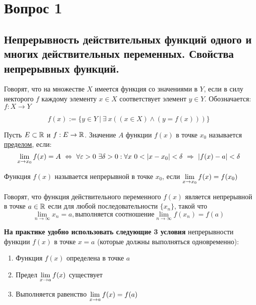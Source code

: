 \section{Вопрос 1}

\subsection{Непрерывность действительных функций одного и многих действительных переменных. Свойства непрерывных функций.}

\begin{DEF}
Говорят, что на множестве $X$ имеется функция со значениями в $Y$, если в силу некторого $f$ каждому элементу $x \in X$ соответствует элемент $y \in Y$. Обозначается: $f: X \to Y$

$$f(x) := \{ y \in Y \ | \ \exists \ x ((x\in X) \wedge (y = f(x))) \} $$
\end{DEF}


\begin{DEF}
	Пусть $E \subset \mathbb{R}$ и $f: E \to \mathbb{R}$. Значение $A$ функции $f(x)$ в точке $x_0$ называется \underline{пределом}, если:
	$$\lim_{x\to x_0} f(x) = A \ \Leftrightarrow \ \forall \varepsilon > 0 \ \exists \delta > 0: \forall x \ 0 < \left| x - x_0\right| < \delta \ \Rightarrow \ \left| f(x) - a\right| < \delta$$
\end{DEF}

\begin{DEF}
	Функция $f(x)$ называется непрерывной в точке $x_0$, если $\lim\limits_{x \to x_0}f(x) = f(x_0)$
\end{DEF}

\begin{DEF}
	Говорят, что функция действительного переменного $f(x)$ является непрерывной в точке $a \in \mathbb{R}$ если для любой последовательности $\{x_n\}$, такой что
	$$\lim_{n \to \infty}x_n = a, \text{выполняется соотношение} \lim_{n \to \infty}f(x_n) = f(a)$$
\end{DEF}

\textbf{На практике удобно использовать следующие 3 условия} непрерывности функции $f(x)$ в точке $x = a$ (которые должны выполняться одновременно):
\begin{enumerate}
	\item Функция $f(x)$ определена в точке $a$
	\item Предел $\lim\limits_{x \to a}f(x)$ существует
	\item Выполняется равенство $\lim\limits_{x \to a}f(x)= f(a)$
\end{enumerate}

